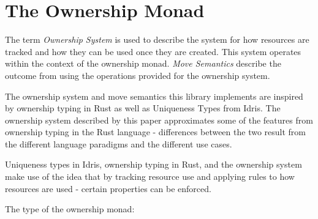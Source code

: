 \documentclass[onehalf,11pt]{beavtex}
\begin{document}



\chapter{The Ownership Monad}

The term \textit{Ownership System} is used to describe the system for how
resources are tracked and how they can be used once they are created. This
system operates within the context of the ownership monad.
\textit{Move Semantics} describe the outcome from using the operations provided
for the ownership system.

The ownership system and move semantics this library implements are inspired by
ownership typing in Rust as well as Uniqueness Types
from Idris.\cite{rust_book_ownership} \cite{idris_uniqueness_types}
The ownership system described by this paper approximates some of the
features from ownership typing in the Rust language - differences between
the two result from the different language paradigms and the different use cases.

Uniqueness types in Idris, ownership typing in Rust, and the ownership system
make use of the idea that by tracking resource use and applying rules to how
resources are used - certain properties can be enforced.

The type of the ownership monad:

\end{document}
